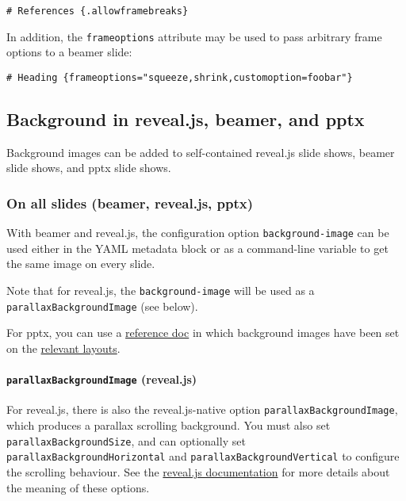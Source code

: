 \begin{verbatim}
# References {.allowframebreaks}
\end{verbatim}

In addition, the \texttt{frameoptions} attribute may be used to pass
arbitrary frame options to a beamer slide:

\begin{verbatim}
# Heading {frameoptions="squeeze,shrink,customoption=foobar"}
\end{verbatim}

\hypertarget{background-in-reveal.js-beamer-and-pptx}{%
\subsection{Background in reveal.js, beamer, and
pptx}\label{background-in-reveal.js-beamer-and-pptx}}

Background images can be added to self-contained reveal.js slide shows,
beamer slide shows, and pptx slide shows.

\hypertarget{on-all-slides-beamer-reveal.js-pptx}{%
\subsubsection{On all slides (beamer, reveal.js,
pptx)}\label{on-all-slides-beamer-reveal.js-pptx}}

With beamer and reveal.js, the configuration option
\texttt{background-image} can be used either in the YAML metadata block
or as a command-line variable to get the same image on every slide.

Note that for reveal.js, the \texttt{background-image} will be used as a
\texttt{parallaxBackgroundImage} (see below).

For pptx, you can use a
\protect\hyperlink{option--reference-doc}{reference doc} in which
background images have been set on the
\protect\hyperlink{powerpoint-layout-choice}{relevant layouts}.

\hypertarget{parallaxbackgroundimage-reveal.js}{%
\paragraph{\texorpdfstring{\texttt{parallaxBackgroundImage}
(reveal.js)}{parallaxBackgroundImage (reveal.js)}}\label{parallaxbackgroundimage-reveal.js}}

For reveal.js, there is also the reveal.js-native option
\texttt{parallaxBackgroundImage}, which produces a parallax scrolling
background. You must also set \texttt{parallaxBackgroundSize}, and can
optionally set \texttt{parallaxBackgroundHorizontal} and
\texttt{parallaxBackgroundVertical} to configure the scrolling
behaviour. See the
\href{https://revealjs.com/backgrounds/\#parallax-background}{reveal.js
documentation} for more details about the meaning of these options.

